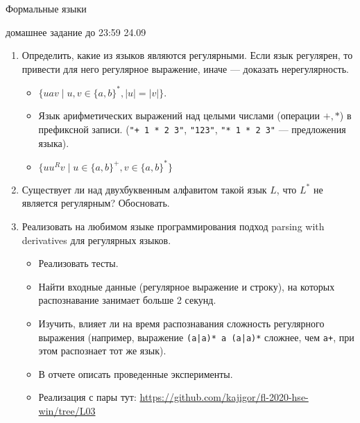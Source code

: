 \documentclass[12pt]{article}
\begin{document}
\begin{center} {\LARGE Формальные языки} \end{center}

\begin{center} \Large домашнее задание до 23:59 24.09 \end{center}
\bigskip

\begin{enumerate}
  \item
  {
    Определить, какие из языков являются регулярными. Если язык регулярен, то привести для него регулярное выражение, иначе --- доказать нерегулярность.
    \begin{itemize}
      \item $\{ u a v \mid u, v \in \{ a, b\}^*, |u| = |v| \}$.
      \item Язык арифметических выражений над целыми числами (операции $+,*$) в префиксной записи. (\verb!"+ 1 * 2 3"!, \verb!"123"!, \verb!"* 1 * 2 3"! --- предложения языка).
      \item $\{u u^R v \mid u \in \{a, b\}^+, v \in \{a, b\}^*\}$
    \end{itemize}
  }
  \item {
    Существует ли над двухбуквенным алфавитом такой язык $L$, что $L^*$ не является регулярным? Обосновать.
  }
  \item
  {
    Реализовать на любимом языке программирования подход parsing with derivatives для регулярных языков.
    \begin{itemize}
      \item Реализовать тесты.
      \item Найти входные данные (регулярное выражение и строку), на которых распознавание занимает больше 2 секунд.
      \item Изучить, влияет ли на время распознавания сложность регулярного выражения (например, выражение \verb!(a|a)* a (a|a)*! сложнее, чем \verb!a+!, при этом распознает тот же язык).
      \item В отчете описать проведенные эксперименты.
      \item Реализация с пары тут: \url{https://github.com/kajigor/fl-2020-hse-win/tree/L03}
    \end{itemize}

  }
\end{enumerate}
\end{document}
